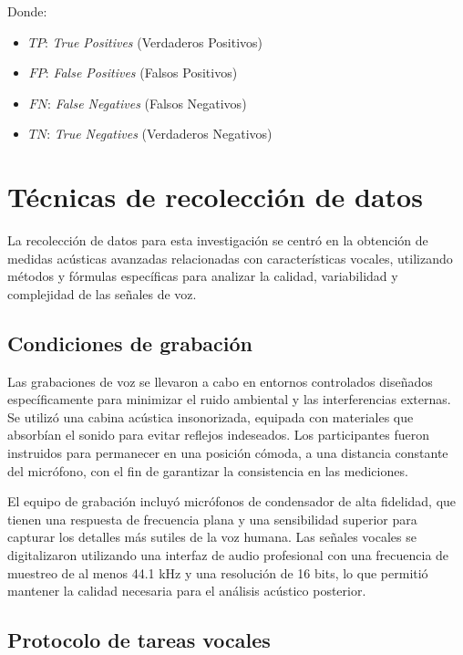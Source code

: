 \documentclass[listof=nochaptergap,12pt,times,authoryear]{report}
\begin{document}
\begin{table}[H]
Donde:
    \begin{itemize}
        \item $TP$: \textit{True Positives} (Verdaderos Positivos)
        \item $FP$: \textit{False Positives} (Falsos Positivos)
        \item $FN$: \textit{False Negatives} (Falsos Negativos)
        \item $TN$: \textit{True Negatives} (Verdaderos Negativos)
    \end{itemize}
\end{table}


\section{Técnicas de recolección de datos}

La recolección de datos para esta investigación se centró en la obtención de medidas acústicas avanzadas relacionadas con características vocales, utilizando métodos y fórmulas específicas para analizar la calidad, variabilidad y complejidad de las señales de voz. 

\subsection{Condiciones de grabación}

Las grabaciones de voz se llevaron a cabo en entornos controlados diseñados específicamente para minimizar el ruido ambiental y las interferencias externas. Se utilizó una cabina acústica insonorizada, equipada con materiales que absorbían el sonido para evitar reflejos indeseados. Los participantes fueron instruidos para permanecer en una posición cómoda, a una distancia constante del micrófono, con el fin de garantizar la consistencia en las mediciones.

El equipo de grabación incluyó micrófonos de condensador de alta fidelidad, que tienen una respuesta de frecuencia plana y una sensibilidad superior para capturar los detalles más sutiles de la voz humana. Las señales vocales se digitalizaron utilizando una interfaz de audio profesional con una frecuencia de muestreo de al menos 44.1 kHz y una resolución de 16 bits, lo que permitió mantener la calidad necesaria para el análisis acústico posterior.

\subsection{Protocolo de tareas vocales}
\end{document}
